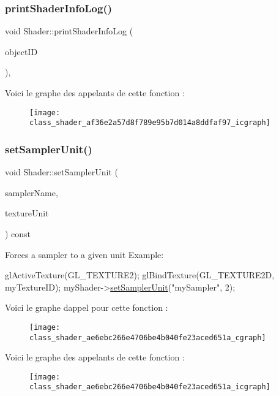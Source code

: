 \subsubsection{\texorpdfstring{print\+Shader\+Info\+Log()}{printShaderInfoLog()}}
{\footnotesize\ttfamily void Shader\+::print\+Shader\+Info\+Log (\begin{DoxyParamCaption}\item[{G\+Luint}]{object\+ID }\end{DoxyParamCaption})\hspace{0.3cm}{\ttfamily [static]}, {\ttfamily [protected]}}

Voici le graphe des appelants de cette fonction \+:\nopagebreak
\begin{figure}[H]
\begin{center}
\leavevmode
\texttt{[image: class\_shader\_af36e2a57d8f789e95b7d014a8ddfaf97\_icgraph]}
\end{center}
\end{figure}
\mbox{\label{class_shader_ae6ebc266e4706be4b040fe23aced651a}} 
\subsubsection{\texorpdfstring{set\+Sampler\+Unit()}{setSamplerUnit()}}
{\footnotesize\ttfamily void Shader\+::set\+Sampler\+Unit (\begin{DoxyParamCaption}\item[{const char $\ast$}]{sampler\+Name,  }\item[{int}]{texture\+Unit }\end{DoxyParamCaption}) const}

Forces a sampler to a given unit Example\+: 
\begin{DoxyCode}
glActiveTexture(GL\_TEXTURE2);
glBindTexture(GL\_TEXTURE2D, myTextureID);
myShader->\hyperlink{class_shader_ae6ebc266e4706be4b040fe23aced651a}{setSamplerUnit}(\textcolor{stringliteral}{"mySampler"}, 2);
\end{DoxyCode}
 Voici le graphe d\textquotesingle{}appel pour cette fonction \+:\nopagebreak
\begin{figure}[H]
\begin{center}
\leavevmode
\texttt{[image: class\_shader\_ae6ebc266e4706be4b040fe23aced651a\_cgraph]}
\end{center}
\end{figure}
Voici le graphe des appelants de cette fonction \+:\nopagebreak
\begin{figure}[H]
\begin{center}
\leavevmode
\texttt{[image: class\_shader\_ae6ebc266e4706be4b040fe23aced651a\_icgraph]}
\end{center}
\end{figure}
\mbox{\label{class_shader_ade2fdfa75d4447eaac246b8d3b799cec}} 
